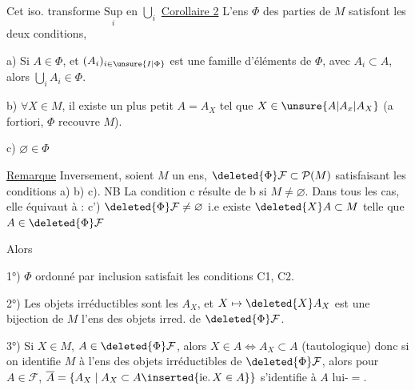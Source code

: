 Cet iso. transforme $\underset{i}{\mathrm{Sup}}$ en $\bigcup_i$
\uline{Corollaire 2} L'ens $\Phi$ des parties de $ M$ satisfont les deux conditions,


 a) Si $A\in\Phi$, et $(A_i)_{i\in\unsure{I|\Phi}}$ est une famille d'éléments de $\Phi$, avec $A_i\subset A$, alors $\bigcup_iA_i\in\Phi$.

b) $\forall X\in M$, il existe un plus petit $A=A_X$ tel que $X\in\unsure{A|A_x|A_X}$ (a fortiori, $\Phi$ recouvre $ M$).


c) $\varnothing\in\Phi$ 


\uline{Remarque} Inversement, soient $ M$ un ens, $\deleted{\Phi}\mathcal F\subset\mathcal P( M)$ satisfaisant les conditions a) b) c). NB La condition c résulte de  b si $ M\ne\varnothing$. Dans tous les cas, elle équivaut à :  c') $\deleted{\Phi}\mathcal F\ne\varnothing$ i.e existe $\deleted{X}A\subset M$ telle que $A\in\deleted{\Phi}\mathcal F$


Alors

1°) $\Phi$ ordonné par inclusion satisfait les conditions C1, C2.  

2°) Les objets irréductibles sont les $A_X$, et $X\mapsto\deleted{X}A_X$ est une bijection de $ M$  l'ens des objets irred. de $\deleted{\Phi}\mathcal F$.

3°) Si $X\in M$, $A\in\deleted{\Phi}\mathcal F$, alors $X\in A\Longleftrightarrow A_X\subset A$  (tautologique) donc  si on identifie $ M$  à l'ens des objets irréductibles de $\deleted{\Phi}\mathcal F$, alors pour $A\in\mathcal F$, $\overline A=\{A_X\mid A_X\subset A\inserted{\text{ie.}\,X\in A}\}$ s'identifie à $A$ lui-$=$.

